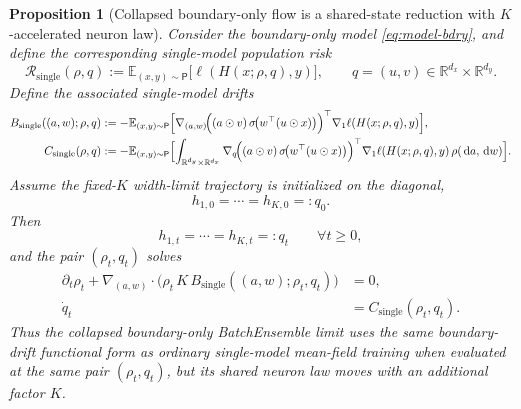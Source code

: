 \documentclass[11pt]{article}
\newtheorem{proposition}[theorem]{Proposition}
\theoremstyle{definition}
\newcommand{\R}{\mathbb{R}}
\newcommand{\E}{\mathbb{E}}
\newcommand{\dd}{\,\mathrm{d}}
\begin{document}
\begin{proposition}[Collapsed boundary-only flow is a shared-state reduction with $K$-accelerated neuron law]
\label{prop:boundary-single-flow}
Consider the boundary-only model \eqref{eq:model-bdry}, and define the
corresponding single-model population risk
\[
  \mathcal R_{\mathrm{single}}(\rho,q)
  :=
  \E_{(x,y)\sim\mathsf P}
  \bigl[\ell(H(x;\rho,q),y)\bigr],
  \qquad
  q=(u,v)\in\R^{d_x}\times\R^{d_y}.
\]
Define the associated single-model drifts
\begin{align}
  B_{\mathrm{single}}((a,w);\rho,q)
  &:=
  -\E_{(x,y)\sim\mathsf P}
  \Bigl[
    \nabla_{(a,w)}\!\Bigl(
      (a\odot v)\,\sigma\!\bigl(w^\top(u\odot x)\bigr)
    \Bigr)^\top
    \nabla_1\ell(H(x;\rho,q),y)
  \Bigr],
  \label{eq:single-bdry-B}\\
  C_{\mathrm{single}}(\rho,q)
  &:=
  -\E_{(x,y)\sim\mathsf P}
  \Bigl[
    \int_{\R^{d_y}\times\R^{d_x}}
    \nabla_q\!\Bigl(
      (a\odot v)\,\sigma\!\bigl(w^\top(u\odot x)\bigr)
    \Bigr)^\top
    \nabla_1\ell(H(x;\rho,q),y)\,\rho(\dd a,\dd w)
  \Bigr].
  \label{eq:single-bdry-C}
\end{align}
Assume the fixed-$K$ width-limit trajectory is initialized on the diagonal,
\[
  h_{1,0}=\cdots=h_{K,0}=:q_0.
\]
Then
\[
  h_{1,t}=\cdots=h_{K,t}=:q_t
  \qquad
  \forall t\ge 0,
\]
and the pair $(\rho_t,q_t)$ solves
\begin{align}
  \partial_t\rho_t
  +
  \nabla_{(a,w)}\cdot
  \bigl(
    \rho_t\,K\,B_{\mathrm{single}}((a,w);\rho_t,q_t)
  \bigr)
  &=0,
  \label{eq:diag-single-pde}\\
  \dot q_t
  &=
  C_{\mathrm{single}}(\rho_t,q_t).
  \label{eq:diag-single-ode}
\end{align}
Thus the collapsed boundary-only BatchEnsemble limit uses the same
boundary-drift functional form as ordinary single-model mean-field training
when evaluated at the same pair $(\rho_t,q_t)$, but its shared neuron law moves
with an additional factor $K$.
\end{proposition}
\end{document}
